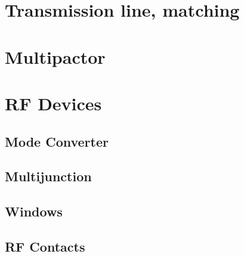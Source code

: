 \chaptertoc{}

\section{Transmission line, matching}

\section{Multipactor}

\section{RF Devices}

\subsection{Mode Converter}
\subsection{Multijunction}
\subsection{Windows}
\subsection{RF Contacts}
